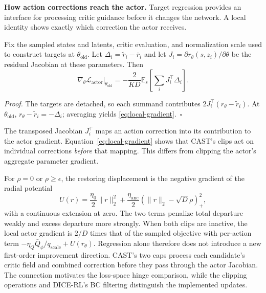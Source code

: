 \textbf{How action corrections reach the actor.}
Target regression provides an interface for processing critic guidance
before it changes the network. A local identity shows exactly which
correction the actor receives.

\begin{proposition}
Fix the sampled states and latents, critic evaluation, and normalization
scale used to construct targets at $\theta_{\mathrm{old}}$. Let
$\Delta_i=\tilde r_i-\bar r_i$ and let
$J_i=\partial r_\theta(s,z_i)/\partial\theta$ be the residual Jacobian at
these parameters. Then
\begin{equation}
 \left.\nabla_\theta\mathcal L_{\mathrm{actor}}\right|_{\theta_{\mathrm{old}}}
 =-\frac{2}{KD}\mathbb E_s\!\left[\sum_i J_i^\top\Delta_i\right].
 \label{eq:local-gradient}
\end{equation}
\end{proposition}
\textit{Proof.}
The targets are detached, so each summand contributes
$2J_i^\top(r_\theta-\tilde r_i)$. At $\theta_{\mathrm{old}}$,
$r_\theta-\tilde r_i=-\Delta_i$; averaging yields
\eqref{eq:local-gradient}.~$\square$

The transposed Jacobian $J_i^\top$ maps an action correction into its
contribution to the actor gradient. Equation~\eqref{eq:local-gradient}
shows that CAST's clips act on individual corrections \emph{before}
that mapping. This differs from clipping the actor's aggregate parameter
gradient.

For $\rho=0$ or $\rho\geq\epsilon$, the restoring displacement is the
negative gradient of the radial potential
\begin{equation}
 U(r)=\frac{\eta_0}{2}\|r\|_2^2+
       \frac{\eta_{\mathrm{anc}}}{2}
       (\|r\|_2-\sqrt D\rho)_+^2,
 \label{eq:radial-potential}
\end{equation}
with a continuous extension at zero. The two terms penalize total departure
weakly and excess departure more strongly. When both clips are inactive,
the local actor gradient is $2/D$ times that of the sampled objective
with per-action term $-\eta_Q\bar Q_\phi/q_{\mathrm{scale}}+U(r_\theta)$.
Regression alone therefore does not introduce a new first-order improvement
direction. CAST's two caps process each candidate's critic field and
combined correction before they pass through the actor Jacobian.
The connection motivates the loss-space hinge comparison, while the
clipping operations and DICE-RL's BC filtering distinguish the implemented
updates.

